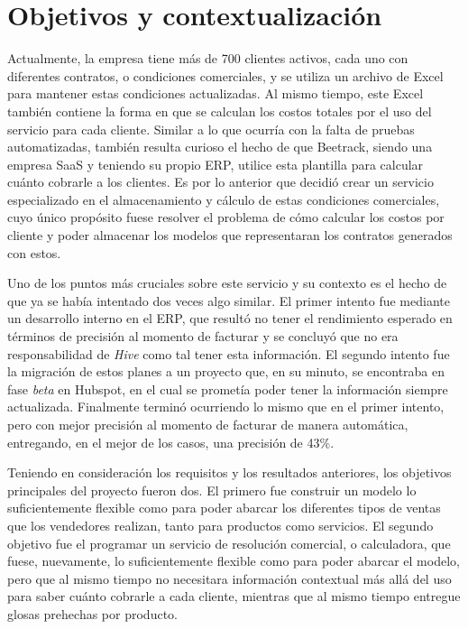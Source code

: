 \section{Objetivos y contextualización}

  Actualmente, la empresa tiene más de 700 clientes activos, cada uno con diferentes contratos, o condiciones comerciales, y se utiliza un archivo de Excel para mantener estas condiciones actualizadas. Al mismo tiempo, este Excel también contiene la forma en que se calculan los costos totales por el uso del servicio para cada cliente. Similar a lo que ocurría con la falta de pruebas automatizadas, también resulta curioso el hecho de que Beetrack, siendo una empresa SaaS y teniendo su propio ERP, utilice esta plantilla para calcular cuánto cobrarle a los clientes. Es por lo anterior que decidió crear un servicio especializado en el almacenamiento y cálculo de estas condiciones comerciales, cuyo único propósito fuese resolver el problema de cómo calcular los costos por cliente y poder almacenar los modelos que representaran los contratos generados con estos.
  
  Uno de los puntos más cruciales sobre este servicio y su contexto es el hecho de que ya se había intentado dos veces algo similar. El primer intento fue mediante un desarrollo interno en el ERP, que resultó no tener el rendimiento esperado en términos de precisión al momento de facturar y se concluyó que no era responsabilidad de \textit{Hive} como tal tener esta información. El segundo intento fue la migración de estos planes a un proyecto que, en su minuto, se encontraba en fase \textit{beta} en Hubspot, en el cual se prometía poder tener la información siempre actualizada. Finalmente terminó ocurriendo lo mismo que en el primer intento, pero con mejor precisión al momento de facturar de manera automática, entregando, en el mejor de los casos, una precisión de 43\%.

  Teniendo en consideración los requisitos y los resultados anteriores, los objetivos principales del proyecto fueron dos. El primero fue construir un modelo lo suficientemente flexible como para poder abarcar los diferentes tipos de ventas que los vendedores realizan, tanto para productos como servicios. El segundo objetivo fue el programar un servicio de resolución comercial, o calculadora, que fuese, nuevamente, lo suficientemente flexible como para poder abarcar el modelo, pero que al mismo tiempo no necesitara información contextual más allá del uso para saber cuánto cobrarle a cada cliente, mientras que al mismo tiempo entregue glosas prehechas por producto.

